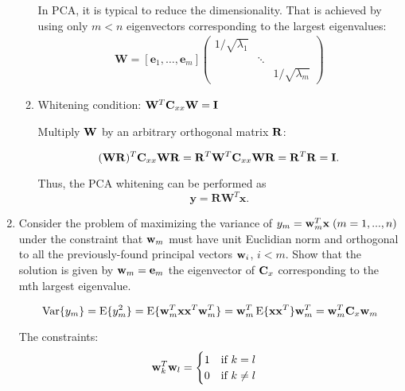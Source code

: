 \begin{enumerate}
\begin{solution}
\begin{enumerate}
      In PCA, it is typical to reduce the dimensionality. That is
      achieved by using only $m<n$ eigenvectors corresponding to the
      largest eigenvalues:
      \begin{align*}
        \mathbf{W} = [\mathbf{e}_1, \ldots, \mathbf{e}_m]
        \begin{pmatrix}
          1/\sqrt{\lambda_1} & &
          \\
          & \ddots &
          \\
          && 1/\sqrt{\lambda_m} 
        \end{pmatrix}
      \end{align*}
      
    \item 
      Whitening condition: $\mathbf{W}^T\mathbf{C}_{xx}\mathbf{W}=\mathbf{I}$

      Multiply $\mathbf{W}$ by an arbitrary orthogonal matrix $\mathbf{R}$:

      \[
      (\mathbf{W}\mathbf{R})^T\mathbf{C}_{xx}\mathbf{W}\mathbf{R} =
      \mathbf{R}^T\mathbf{W}^T\mathbf{C}_{xx}\mathbf{W}\mathbf{R} =
      \mathbf{R}^T\mathbf{R} = \mathbf{I}.
      \]

      Thus, the PCA whitening can be performed as
      \[
      \mathbf{y} = \mathbf{RW}^T \mathbf{x}.
      \]
    \end{enumerate}
    
  \end{solution}

\item Consider the problem of maximizing the variance of $y_m = {\bf
    w}_m^T{\bf x}\; (m=1, ..., n)$ under the constraint that ${\bf
    w}_m$ must have unit Euclidian norm and orthogonal to all the
  previously-found principal vectors ${\bf w}_i$, $i<m$. Show that the
  solution is given by ${\bf w}_m={\bf e}_m$ the eigenvector of ${\bf
    C}_x$ corresponding to the mth largest eigenvalue.

  \begin{solution}

    \begin{equation*}
      \operatorname{Var}\{ y_m \} = \operatorname{E} \{ y_m^2 \} = \operatorname{E} \{ \mathbf{w}_m^T \mathbf{x} \mathbf{x}^T \mathbf{w}_m^T \}
      = \mathbf{w}_m^T \operatorname{E} \{ \mathbf{x} \mathbf{x}^T \} \mathbf{w}_m^T = \mathbf{w}_m^T \mathbf{C}_x \mathbf{w}_m
    \end{equation*}

    The constraints:
    \begin{equation*}
      \mathbf{w}_k^T \mathbf{w}_l = \begin{cases}1 \quad\text{if $k=l$} \\
        0 \quad\text{if $k \neq l$} \end{cases}
    \end{equation*}


\end{solution}
\end{enumerate}
